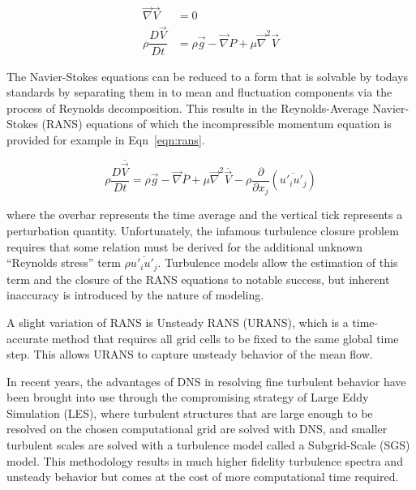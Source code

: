 \documentclass[journal]{new-aiaa}
\begin{document}
\begin{equation}
\label{eqn:navierstokes}
\begin{split}
\vec{\nabla}\vec{V} &= 0 \\
\rho \dfrac{D \vec{V}}{D t}
    &= \rho\vec{g} - \vec{\nabla} P + \mu \vec{\nabla}^2 \vec{V}
\end{split}
\end{equation}

The Navier-Stokes equations can be reduced to a form that is solvable by todays standards by separating them in to mean and fluctuation components via the process of Reynolds decomposition. This results in the Reynolds-Average Navier-Stokes (RANS) equations of which the incompressible momentum equation is provided for example in Eqn~\ref{eqn:rans}.



\begin{equation}
\label{eqn:rans}
\rho \dfrac{D \overline{\vec{V}}}{D t}
    = \rho\vec{g} - \vec{\nabla} \overline{P}
    + \mu \vec{\nabla}^2 \overline{\vec{V}}
    - \rho \dfrac{\partial}{\partial x_j} \left( \overline{u'_i u'_j} \right)
\end{equation}

\noindent where the overbar represents the time average and the vertical tick represents a perturbation quantity. Unfortunately, the infamous turbulence closure problem requires that some relation must be derived for the additional unknown ``Reynolds stress'' term $\rho \overline{u'_i u'_j}$. Turbulence models allow the estimation of this term and the closure of the RANS equations to notable success, but inherent inaccuracy is introduced by the nature of modeling.

A slight variation of RANS is Unsteady RANS (URANS), which is a time-accurate method that requires all grid cells to be fixed to the same global time step.  This allows URANS to capture unsteady behavior of the mean flow.

In recent years, the advantages of DNS in resolving fine turbulent behavior have been brought into use through the compromising strategy of Large Eddy Simulation (LES), where turbulent structures that are large enough to be resolved on the chosen computational grid are solved with DNS, and smaller turbulent scales are solved with a turbulence model called a Subgrid-Scale (SGS) model. This methodology results in much higher fidelity turbulence spectra and unsteady behavior but comes at the cost of more computational time required.
\end{document}
